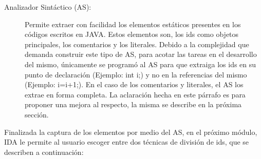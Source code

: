 \begin{description}

\item[Analizador Sintáctico (AS):] Permite extraer con facilidad los elementos estáticos presentes en los códigos escritos en JAVA. Estos elementos son, los ids como objetos principales, los comentarios y los literales. Debido a la complejidad que demanda construir este tipo de AS, para acotar las tareas en el desarrollo del mismo, únicamente se programó al AS para que extraiga los ids en su punto de declaración (Ejemplo: int i;) y no en la referencias del mismo (Ejemplo: i=i+1;). En el caso de los comentarios y literales, el AS los extrae en forma completa. La aclaración hecha en este párrafo es para proponer una mejora al respecto, la misma se describe en la próxima sección.

\end{description}

Finalizada la captura de los elementos por medio del AS, en el próximo módulo, IDA le permite al usuario escoger entre dos técnicas de división de ids, que se describen a continuación:


